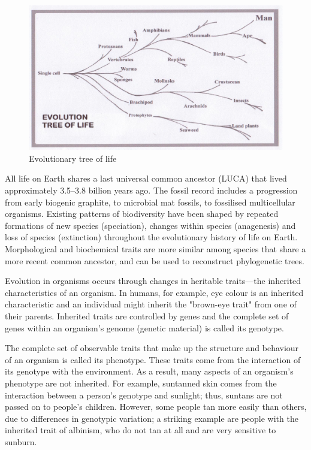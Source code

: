 \begin{figure}[htb] 
	\label{fig:tree_of_life}
	\centering
	\includegraphics[width=\textwidth]{figures/tree_of_life}
	\caption{Evolutionary tree of life}
\end{figure}

All life on Earth shares a last universal common ancestor (LUCA) that lived approximately
3.5–3.8 billion years ago.
The fossil record includes a progression from early biogenic graphite, to microbial mat fossils,
to fossilised multicellular organisms.
Existing patterns of biodiversity have been shaped by repeated formations of new species 
(speciation), changes within species (anagenesis) and loss of species (extinction) throughout the 
evolutionary history of life on Earth.
Morphological and biochemical traits are more similar among species that share a more recent 
common ancestor, and can be used to reconstruct phylogenetic trees.

Evolution in organisms occurs through changes in heritable traits—the inherited characteristics of
an organism. 
In humans, for example, eye colour is an inherited characteristic and an individual might inherit 
the "brown-eye trait" from one of their parents.
Inherited traits are controlled by genes and the complete set of genes within an organism's genome
(genetic material) is called its genotype.

The complete set of observable traits that make up the structure and behaviour of an organism is
called its phenotype. 
These traits come from the interaction of its genotype with the environment. 
As a result, many aspects of an organism's phenotype are not inherited. For example, suntanned skin
comes from the interaction between a person's genotype and sunlight; thus, suntans are not passed
on to people's children.
However, some people tan more easily than others, due to differences in genotypic variation;
a striking example are people with the inherited trait of albinism,
who do not tan at all and are very sensitive to sunburn.

